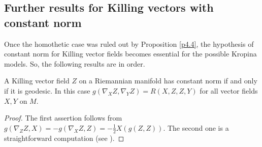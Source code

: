 \documentclass[reqno,10pt]{amsart}
\begin{document}
 \subsection{Further results for Killing vectors  with constant norm} \label{s4.2} Once the homothetic case was ruled out by Proposition \ref{p4.4}, the hypothesis of constant norm for  Killing vector fields becomes essential for the possible Kropina models. So, the following results are in order. 

\begin{lemma}\label{p4.1} A  Killing vector field $Z$ on a Riemannian manifold  has constant norm if and only if it is geodesic. In this case 
  $g(\nabla_X Z,\nabla_Y Z) = R(X,Z,Z,Y)$ for all vector fields $X,Y$ on $M$. 
\end{lemma}
\begin{proof}  The first assertion follows from $g(\nabla_ZZ,X)=-g(\nabla_XZ,Z)=- \frac 12 X(g(Z,Z))$.
The second one is a straightforward computation  (see 
\cite[Lemma 3, Prop. 1] {BerNik09}).
\end{proof}
\end{document}
